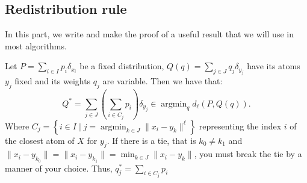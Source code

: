 \documentclass{amsart}
\newcommand{\argmin}{\mathop{\arg\min}}
\begin{document}
\subsection{Redistribution rule}\label{redistribution rule}
In this part, we write and make the proof of a useful result that we will use in most algorithms.
\begin{theorem}\label{closed formula}
    Let $P=\sum_{i\in I}p_i\delta_{x_i}$ be a fixed distribution, $Q\left(q\right)=\sum_{j\in J}q_j\delta_{y_j}$ have its atoms $y_j$ fixed and its weights $q_j$ are variable. Then we have that: 
    $$Q^*=\sum_{j\in J}\left(\sum_{i\in C_j}p_i\right)\delta_{y_j}\in \argmin_q d_\ell\left(P,Q\left(q\right)\right).$$
    Where $C_j=\left\{i\in I \mid j=\argmin_{k\in J} \lVert x_i-y_k\rVert^\ell\right\}$ representing the index $i$ of the closest atom of $X$ for $y_j$. If there is a tie, that is $k_0\ne k_1$ and $\lVert x_i-y_{k_0}\rVert=\lVert x_i-y_{k_1}\rVert=\min_{k\in J}\lVert x_i-y_{k}\rVert$, you must break the tie by a manner of your choice. Thus, $q_j^*=\sum_{i\in C_j}p_i$
\end{theorem}
\end{document}
